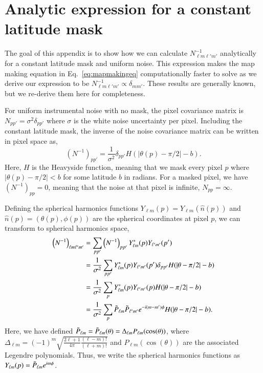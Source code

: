 \documentclass[twocolumn]{../common/aa}
\begin{document}


\appendix

\section{Analytic expression for a constant latitude mask}
\label{sec:appendixA}


The goal of this appendix is to show how we can calculate $N_{\ell m \ell' m'}^{-1}$ analytically for a constant latitude mask and uniform noise. This expression makes the map making equation in Eq.~\eqref{eq:mapmakingeq} computationally faster to solve as we derive our expression to be $N_{\ell m \ell' m'}^{-1} \propto \delta_{mm'}$. These results are generally known, but we re-derive them here for completeness.

For uniform instrumental noise with no mask, the pixel covariance matrix is $N_{pp'} = \sigma^2 \delta_{pp'}$ where $\sigma$ is the white noise uncertainty per pixel. Including the constant latitude mask, the inverse of the noise covariance matrix can be written in pixel space as,
$$
\left(N^{-1} \right)_{pp'} = \frac{1}{\sigma^2} \delta_{pp'} H(|\theta(p) -\pi/2|-b).
$$
Here, $H$ is the Heavyside function, meaning that we mask every pixel $p$ where $|\theta(p) -\pi/2| < b$ for some latitude $b$ in radians. For a masked pixel, we have $\left(N^{-1} \right)_{pp}=0$, meaning that the noise at that pixel is infinite, $N_{pp} = \infty$.

Defining the spherical harmonics functions $Y_{\ell m}\left(p\right) = Y_{\ell m}\left(\hat{n}(p)\right)$ and $\hat{n}(p) = (\theta(p), \phi(p))$ are the spherical coordinates at pixel $p$, we can transform to spherical harmonics space,
\begin{align}
\nonumber
\left(N^{-1}\right)_{\ell m \ell' m'} &= \sum_{p p'}\left(N^{-1}\right)_{pp'}Y^{*}_{\ell m}(p)Y_{\ell' m'}(p')\\
\nonumber
&= \frac{1}{\sigma^2}\sum_{p p'} Y^{*}_{\ell m}(p)Y_{\ell' m'}(p') \delta_{pp'} H(|\theta -\pi/2|-b)\\
\nonumber
&= \frac{1}{\sigma^2}\sum_{p } Y^{*}_{\ell m}(p)Y_{\ell' m'}(p) H(|\theta -\pi/2|-b)\\
&= \frac{1}{\sigma^2}\sum_p \Tilde{P}_{\ell m}\Tilde{P}_{\ell' m'} e^{-i(m-m')\phi} H(|\theta -\pi/2|-b).
\end{align}
Here, we have defined $\Tilde{P}_{\ell m}=\Tilde{P}_{\ell m}(\theta) = \Delta_{\ell m}P_{\ell m}(\cos(\theta))$, where ${\Delta_{\ell m}=(-1)^m \sqrt{\frac{2\ell+1}{4\pi}\frac{(\ell - m)!}{(\ell+m)!}}}$ and $P_{\ell m}(\cos(\theta))$ are the associated Legendre polynomials. Thus, we write the spherical harmonics functions as $Y_{\ell m}(p) = \Tilde{P}_{\ell m} e^{im\phi}$.
\end{document}
